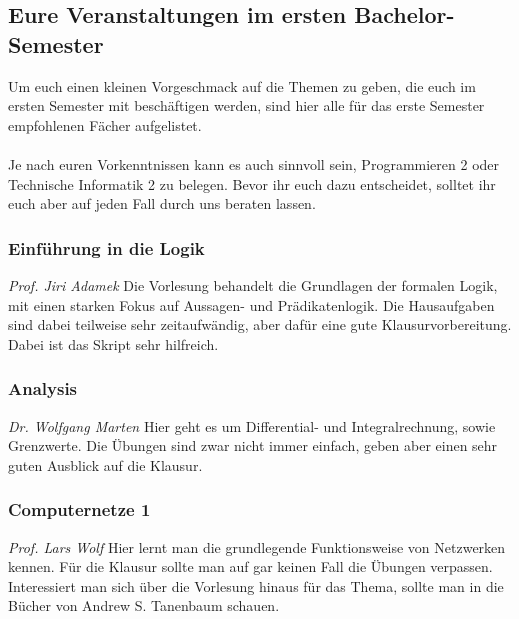 \begin{multicols}{2}
\subsection{Eure Veranstaltungen im ersten Bachelor-Semester}
	Um euch einen kleinen Vorgeschmack auf die Themen zu geben, die euch im ersten Semester mit beschäftigen werden, sind hier alle für das erste Semester empfohlenen Fächer aufgelistet.\\\\
	Je nach euren Vorkenntnissen kann es auch sinnvoll sein, Programmieren 2 oder Technische Informatik 2 zu belegen. Bevor ihr euch dazu entscheidet, solltet ihr euch aber auf jeden Fall durch uns beraten lassen.

\subsubsection{Einführung in die Logik}
	\textit{Prof. Jiri Adamek}
	Die Vorlesung behandelt die Grundlagen der formalen Logik, mit einen starken Fokus auf Aussagen- und Prädikatenlogik. Die Hausaufgaben sind dabei teilweise sehr zeitaufwändig, aber dafür eine gute Klausurvorbereitung. Dabei ist das Skript sehr hilfreich.

\subsubsection{Analysis}
	\textit{Dr. Wolfgang Marten}
	Hier geht es um Differential- und Integralrechnung, sowie Grenzwerte. Die Übungen sind zwar nicht immer einfach, geben aber einen sehr guten Ausblick auf die Klausur.

\subsubsection{Computernetze 1}
	\textit{Prof. Lars Wolf}
	Hier lernt man die grundlegende Funktionsweise von Netzwerken kennen. Für die Klausur sollte man auf gar keinen Fall die Übungen verpassen. Interessiert man sich über die Vorlesung hinaus für das Thema, sollte man in die Bücher von Andrew S. Tanenbaum schauen.



\end{multicols}
